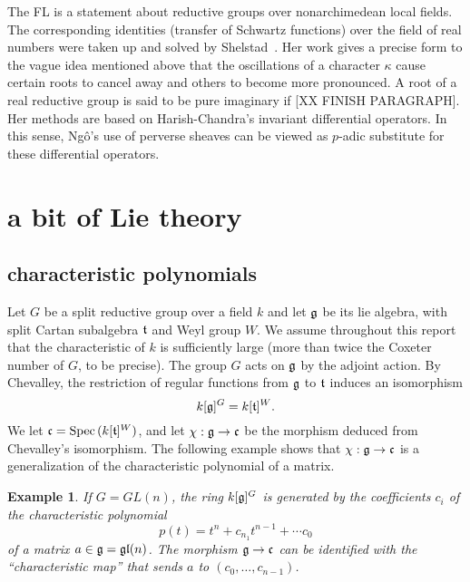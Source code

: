 \documentclass[brochure,english,12pt]{bourbaki}
\newtheorem{example}[equation]{Example}
\def\op#1{{\operatorname{#1}}}
\def\gl{\frak{gl}}
\def\g{\frak{g}}
\def\t{\frak{t}}
\def\cc{\frak{c}}
\begin{document}
The FL is a statement about reductive groups over nonarchimedean local
fields.  The corresponding identities (transfer of Schwartz functions)
over the field of real numbers were taken up and solved by
Shelstad~\cite{XX}.  Her work gives a precise form to the vague idea
mentioned above that the oscillations of a character $\kappa$ cause
certain roots to cancel away and others to become more pronounced.  A
root of a real reductive group is said to be pure imaginary if [XX FINISH PARAGRAPH].   
Her
methods are based on Harish-Chandra's invariant differential
operators.  In this sense, Ng\^o's use of perverse sheaves can be viewed
as $p$-adic substitute for these differential operators.



\section{a bit of Lie theory}



\subsection{characteristic polynomials}\label{sec:chevalley}



Let $G$ be a split reductive group over a field $k$ and let
$\g$ be its lie algebra, with split Cartan subalgebra $\t$ and Weyl
group $W$.  We assume throughout this report that the characteristic of $k$ is sufficiently
large (more than twice the Coxeter number of $G$, to be precise).  The group
$G$ acts on $\g$ by the adjoint action.  By Chevalley,  the restriction  of regular
functions from $\g$ to $\t$ induces an isomorphism
\[
k[\g]^G = k[\t]^W.
\]
We let $\cc =  \op{Spec}\,(k[\t]^W)$, and let $\chi:\g\to\cc$ be the morphism deduced from
Chevalley's isomorphism.  The following example shows that $\chi:\g\to\cc$ is a generalization
of the characteristic polynomial of a matrix.

\begin{example}
If $G=GL(n)$, the ring $k[\g]^G$ is generated by the coefficients $c_i$ of the characteristic
polynomial 
\begin{equation}
p(t)=t^n + c_{n_1} t^{n-1} +\cdots c_0
\end{equation}
of a matrix $a\in \g=\gl(n)$.  The morphism $\g\to\cc$ can be identified with
the ``characteristic map'' that sends $a$ to $(c_0,\ldots,c_{n-1})$.
\end{example}
\end{document}

